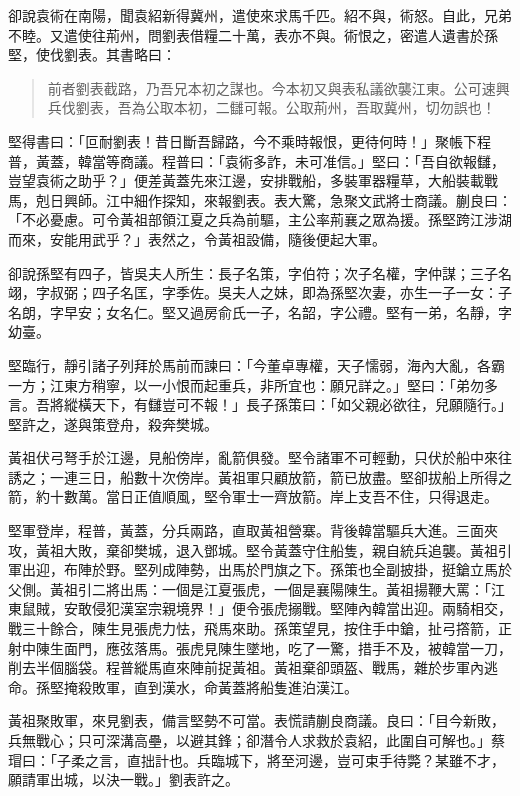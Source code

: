 卻說袁術在南陽，聞袁紹新得冀州，遣使來求馬千匹。紹不與，術怒。自此，兄弟不睦。又遣使往荊州，問劉表借糧二十萬，表亦不與。術恨之，密遣人遺書於孫堅，使伐劉表。其書略曰：

\begin{quote}
前者劉表截路，乃吾兄本初之謀也。今本初又與表私議欲襲江東。公可速興兵伐劉表，吾為公取本初，二讎可報。公取荊州，吾取冀州，切勿誤也！
\end{quote}

堅得書曰：「叵耐劉表！昔日斷吾歸路，今不乘時報恨，更待何時！」聚帳下程普，黃蓋，韓當等商議。程普曰：「袁術多詐，未可准信。」堅曰：「吾自欲報讎，豈望袁術之助乎？」便差黃蓋先來江邊，安排戰船，多裝軍器糧草，大船裝載戰馬，剋日興師。江中細作探知，來報劉表。表大驚，急聚文武將士商議。蒯良曰：「不必憂慮。可令黃祖部領江夏之兵為前驅，主公率荊襄之眾為援。孫堅跨江涉湖而來，安能用武乎？」表然之，令黃祖設備，隨後便起大軍。

卻說孫堅有四子，皆吳夫人所生：長子名策，字伯符；次子名權，字仲謀；三子名翊，字叔弼；四子名匡，字季佐。吳夫人之妹，即為孫堅次妻，亦生一子一女：子名朗，字早安；女名仁。堅又過房俞氏一子，名韶，字公禮。堅有一弟，名靜，字幼臺。

堅臨行，靜引諸子列拜於馬前而諫曰：「今董卓專權，天子懦弱，海內大亂，各霸一方；江東方稍寧，以一小恨而起重兵，非所宜也：願兄詳之。」堅曰：「弟勿多言。吾將縱橫天下，有讎豈可不報！」長子孫策曰：「如父親必欲往，兒願隨行。」堅許之，遂與策登舟，殺奔樊城。

黃祖伏弓弩手於江邊，見船傍岸，亂箭俱發。堅令諸軍不可輕動，只伏於船中來往誘之；一連三日，船數十次傍岸。黃祖軍只顧放箭，箭已放盡。堅卻拔船上所得之箭，約十數萬。當日正值順風，堅令軍士一齊放箭。岸上支吾不住，只得退走。

堅軍登岸，程普，黃蓋，分兵兩路，直取黃祖營寨。背後韓當驅兵大進。三面夾攻，黃祖大敗，棄卻樊城，退入鄧城。堅令黃蓋守住船隻，親自統兵追襲。黃祖引軍出迎，布陣於野。堅列成陣勢，出馬於門旗之下。孫策也全副披掛，挺鎗立馬於父側。黃祖引二將出馬：一個是江夏張虎，一個是襄陽陳生。黃祖揚鞭大罵：「江東鼠賊，安敢侵犯漢室宗親境界！」便令張虎搦戰。堅陣內韓當出迎。兩騎相交，戰三十餘合，陳生見張虎力怯，飛馬來助。孫策望見，按住手中鎗，扯弓撘箭，正射中陳生面門，應弦落馬。張虎見陳生墜地，吃了一驚，措手不及，被韓當一刀，削去半個腦袋。程普縱馬直來陣前捉黃祖。黃祖棄卻頭盔、戰馬，雜於步軍內逃命。孫堅掩殺敗軍，直到漢水，命黃蓋將船隻進泊漢江。

黃祖聚敗軍，來見劉表，備言堅勢不可當。表慌請蒯良商議。良曰：「目今新敗，兵無戰心；只可深溝高壘，以避其鋒；卻潛令人求救於袁紹，此圍自可解也。」蔡瑁曰：「子柔之言，直拙計也。兵臨城下，將至河邊，豈可束手待斃？某雖不才，願請軍出城，以決一戰。」劉表許之。


